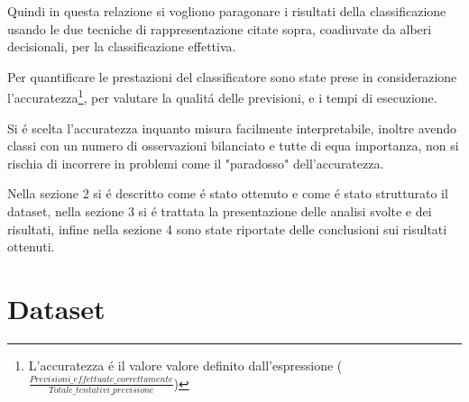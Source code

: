 \documentclass[runningheads]{llncs}
\begin{document}
Quindi in questa relazione si vogliono paragonare i risultati della classificazione usando le due tecniche di rappresentazione citate sopra, coadiuvate da alberi decisionali, per la classificazione effettiva.

Per quantificare le prestazioni del classificatore sono state prese in considerazione l'accuratezza\footnote{L'accuratezza \'e il valore valore definito dall'espressione ($\frac{ Previsioni\_effettuate\_correttamente}{Totale\_tentativi\_previsione}$)}, per valutare la qualit\'a delle previsioni, e i tempi di esecuzione.

Si \'e scelta l'accuratezza inquanto misura facilmente interpretabile, inoltre avendo classi con un numero di osservazioni bilanciato e tutte di equa importanza, non si rischia di incorrere in problemi come il "paradosso" dell'accuratezza.

Nella sezione 2 si \'e descritto come \'e stato ottenuto e come \'e stato strutturato il dataset, nella sezione 3 si \'e trattata la presentazione delle analisi svolte e dei risultati, infine nella sezione 4 sono state riportate delle conclusioni sui risultati ottenuti.



%
%

\section{Dataset}
\label{sec:dataset}
\end{document}
